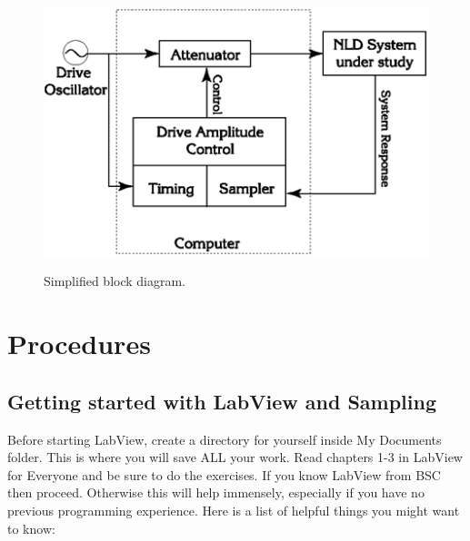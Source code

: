 \documentclass{../lab}
\begin{document}
\begin{figure}[h]
    \centering
    \href{http://experimentationlab.berkeley.edu/sites/default/files/images/Nldimage066.gif}{\includegraphics[width=0.7\linewidth]{images/Nldimage066.png}}
    \caption{Simplified block diagram.}
    \label{fig:SimplifiedBlockDiagram}
\end{figure}

\section{Procedures}

\subsection{Getting started with LabView and Sampling}

Before starting LabView, create a directory for yourself inside My Documents folder. This is where you will save ALL your work. Read chapters 1-3 in LabView for Everyone and be sure to do the exercises. If you know LabView from BSC then proceed. Otherwise this will help immensely, especially if you have no previous programming experience. Here is a list of helpful things you might want to know:
\end{document}
